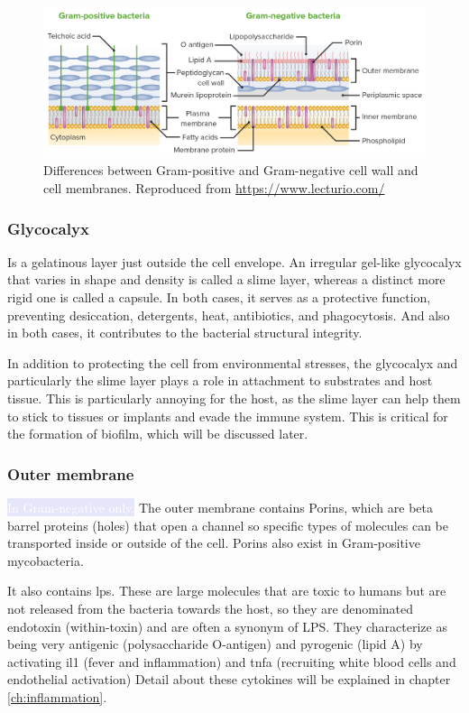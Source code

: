     \begin{figure}[ht]
        \centering
            \includegraphics[width=0.7\linewidth]{figures/Staph/Differences-between-gram-positive-and-gram-negative-bacteria-cell.png} 
            \caption{Differences between Gram-positive and Gram-negative cell wall and cell membranes. Reproduced from \url{https://www.lecturio.com/}}
            \label{figure:gram}
    \end{figure}

\subsubsection{Glycocalyx}

Is a gelatinous layer just outside the cell envelope. An irregular gel-like glycocalyx that varies in shape and density is called a slime layer, whereas a distinct more rigid one is called a capsule. In both cases, it serves as a protective function, preventing desiccation, detergents, heat, antibiotics, and phagocytosis. And also in both cases, it contributes to the bacterial structural integrity. 

In addition to protecting the cell from environmental stresses, the glycocalyx and particularly the slime layer plays a role in attachment to substrates and host tissue. This is particularly annoying for the host, as the slime layer can help them to stick to tissues or implants and evade the immune system. This is critical for the formation of biofilm, which will be discussed later.

\subsubsection{Outer membrane}
\label{staph:OuterMembrane}

\colorbox{Lavender}{\textcolor{white}{In Gram-negative only.}} The outer membrane contains Porins, which are beta barrel proteins (holes) that open a channel so  specific types of molecules can be transported inside or outside of the cell. Porins also exist in Gram-positive mycobacteria.

It also contains \gls{lps}. These are large molecules that are toxic to humans but are not released from the bacteria towards the host, so they are denominated endotoxin (within-toxin) and are often a synonym of LPS. They characterize as being very antigenic (polysaccharide O-antigen) and pyrogenic (lipid A) by activating \gls{il1} (fever and inflammation) and \gls{tnfa} (recruiting white blood cells and endothelial activation) Detail about these cytokines will be explained in chapter \ref{ch:inflammation}.

